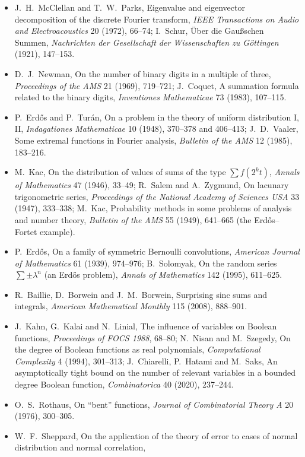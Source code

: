 \begin{itemize}
\item J.~H.~McClellan and T.~W.~Parks, Eigenvalue and eigenvector decomposition of the discrete Fourier transform, \emph{IEEE
Transactions on Audio and Electroacoustics} 20 (1972), 66--74; I.~Schur, Über die Gaußschen Summen, \emph{Nachrichten der Gesellschaft
der Wissenschaften zu Göttingen} (1921), 147--153.
\item D.~J.~Newman, On the number of binary digits in a multiple of three, \emph{Proceedings of the AMS} 21 (1969), 719--721; J.~Coquet,
A summation formula related to the binary digits, \emph{Inventiones Mathematicae} 73 (1983), 107--115.
\item P.~Erdős and P.~Turán, On a problem in the theory of uniform distribution I, II, \emph{Indagationes Mathematicae} 10 (1948),
370--378 and 406--413; J.~D.~Vaaler, Some extremal functions in Fourier analysis, \emph{Bulletin of the AMS} 12 (1985), 183--216.
\item M.~Kac, On the distribution of values of sums of the type $\sum f(2^kt)$, \emph{Annals of Mathematics} 47 (1946), 33--49; R.~Salem and
A.~Zygmund, On lacunary trigonometric series, \emph{Proceedings of the National Academy of Sciences USA} 33 (1947), 333--338; M.~Kac,
Probability methods in some problems of analysis and number theory, \emph{Bulletin of the AMS} 55 (1949), 641--665 (the
Erdős--Fortet example).
\item P.~Erdős, On a family of symmetric Bernoulli convolutions, \emph{American Journal of Mathematics} 61 (1939), 974--976; B.~Solomyak,
On the random series $\sum\pm\lambda^n$ (an Erdős problem), \emph{Annals of Mathematics} 142 (1995), 611--625.
\item R.~Baillie, D.~Borwein and J.~M.~Borwein, Surprising sinc sums and integrals, \emph{American Mathematical Monthly} 115 (2008),
888--901.
\item J.~Kahn, G.~Kalai and N.~Linial, The influence of variables on Boolean functions, \emph{Proceedings of FOCS 1988}, 68--80;
N.~Nisan and M.~Szegedy, On the degree of Boolean functions as real polynomials, \emph{Computational Complexity} 4 (1994), 301--313;
J.~Chiarelli, P.~Hatami and M.~Saks, An asymptotically tight bound on the number of relevant variables in a bounded degree Boolean
function, \emph{Combinatorica} 40 (2020), 237--244.
\item O.~S.~Rothaus, On ``bent'' functions, \emph{Journal of Combinatorial Theory A} 20 (1976), 300--305.
\item W.~F.~Sheppard, On the application of the theory of error to cases of normal distribution and normal correlation,

\end{itemize}
